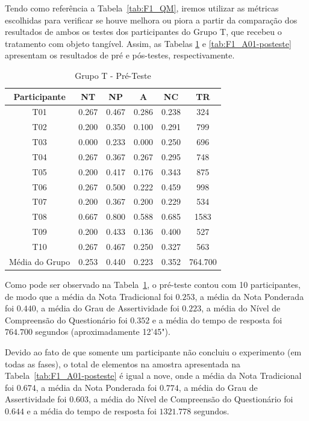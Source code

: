 Tendo como referência a Tabela~\ref{tab:F1_QM}, iremos utilizar as métricas escolhidas para verificar se houve melhora ou piora a partir da comparação dos resultados de ambos os testes dos participantes do Grupo T, que recebeu o tratamento com objeto tangível. Assim, as Tabelas \ref{tab:F1_A01-preteste} e \ref{tab:F1_A01-posteste} apresentam os resultados de pré e pós-testes, respectivamente.

\begin{table}[htbp]
	\centering
	\caption{Grupo T - Pré-Teste}		
	\begin{tabular}{|c|c|c|c|c|c|}
		\hline
		\rowcolor[HTML]{C0C0C0} 
		\textbf{Participante} & \textbf{NT} & \textbf{NP} & \textbf{A} & \textbf{NC} & \textbf{TR} \\ \hline
		T01 & 0.267 & 0.467 & 0.286 & 0.238 & 324 \\ \hline
		\rowcolor[HTML]{EFEFEF} 
		T02 & 0.200 & 0.350 & 0.100 & 0.291 & 799 \\ \hline
		T03 & 0.000 & 0.233 & 0.000 & 0.250 & 696 \\ \hline
		\rowcolor[HTML]{EFEFEF} 
		T04 & 0.267 & 0.367 & 0.267 & 0.295 & 748 \\ \hline
		T05 & 0.200 & 0.417 & 0.176 & 0.343 & 875 \\ \hline
		\rowcolor[HTML]{EFEFEF} 
		T06 & 0.267 & 0.500 & 0.222 & 0.459 & 998 \\ \hline
		T07 & 0.200 & 0.367 & 0.200 & 0.229 & 534 \\ \hline
		\rowcolor[HTML]{EFEFEF} 
		T08 & 0.667 & 0.800 & 0.588 & 0.685 & 1583 \\ \hline
		T09 & 0.200 & 0.433 & 0.136 & 0.400 & 527 \\ \hline
		\rowcolor[HTML]{EFEFEF} 
		T10 & 0.267 & 0.467 & 0.250 & 0.327 & 563 \\ \hline
		Média do Grupo & 0.253 & 0.440 & 0.223 & 0.352 & 764.700  \\ \hline
	\end{tabular}
	\label{tab:F1_A01-preteste}
\end{table}

Como pode ser observado na Tabela~\ref{tab:F1_A01-preteste}, o pré-teste contou com 10 participantes, de modo que a média da Nota Tradicional foi $0.253$, a média da Nota Ponderada foi $0.440$, a média do Grau de Assertividade foi $0.223$, a média do Nível de Compreensão do Questionário foi $0.352$ e a média do tempo de resposta foi $764.700$ segundos (aproximadamente 12'45").

Devido ao fato de que somente um participante não concluiu o experimento (em todas as fases), o total de elementos na amostra apresentada na Tabela~\ref{tab:F1_A01-posteste} é igual a nove, onde a média da Nota Tradicional foi $0.674$, a média da Nota Ponderada foi $0.774$, a média do Grau de Assertividade foi $0.603$, a média do Nível de Compreensão do Questionário foi $0.644$ e a média do tempo de resposta foi $1321.778$ segundos.

